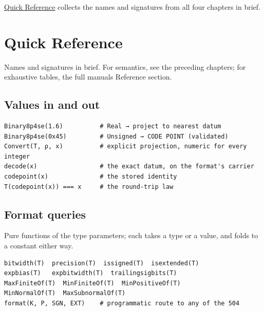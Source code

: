 \href{reference.md}{Quick Reference} collects the names and signatures from all four chapters in brief.





\chapter{Quick Reference}



\label{10518953264959401364}{}


Names and signatures in brief. For semantics, see the preceding chapters; for exhaustive tables, the full manual{\textquotesingle}s Reference section.



\section{Values in and out}



\label{6161161780416834527}{}



\begin{verbatim}
Binary8p4se(1.6)          # Real → project to nearest datum
Binary8p4se(0x45)         # Unsigned → CODE POINT (validated)
Convert(T, ρ, x)          # explicit projection, numeric for every integer
decode(x)                 # the exact datum, on the format's carrier
codepoint(x)              # the stored identity
T(codepoint(x)) === x     # the round-trip law
\end{verbatim}



\section{Format queries}



\label{11700971017834573131}{}


Pure functions of the type parameters; each takes a type or a value, and folds to a constant either way.




\begin{verbatim}
bitwidth(T)  precision(T)  issigned(T)  isextended(T)
expbias(T)   expbitwidth(T)  trailingsigbits(T)
MaxFiniteOf(T)  MinFiniteOf(T)  MinPositiveOf(T)
MinNormalOf(T)  MaxSubnormalOf(T)
format(K, P, SGN, EXT)    # programmatic route to any of the 504
\end{verbatim}



